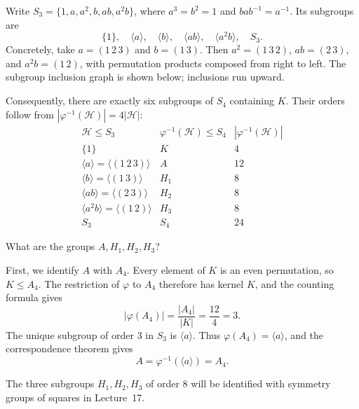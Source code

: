 \documentclass[reqno,11pt]{amsart}
\begin{document}
Write $S_3=\{1,a,a^2,b,ab,a^2b\}$, where $a^3=b^2=1$ and
$bab^{-1}=a^{-1}$. Its subgroups are
\[
  \{1\},\quad \langle a\rangle,\quad
  \langle b\rangle,\quad \langle ab\rangle,\quad
  \langle a^2b\rangle,\quad S_3.
\]
Concretely, take $a=(1\,2\,3)$ and $b=(1\,3)$. Then
$a^2=(1\,3\,2)$, $ab=(2\,3)$, and $a^2b=(1\,2)$, with permutation
products composed from right to left. The subgroup inclusion graph is
shown below; inclusions run upward.
\begin{center}
\end{center}

Consequently, there are exactly six subgroups of $S_4$ containing $K$.
Their orders follow from $|\varphi^{-1}(\mathcal H)|=4|\mathcal H|$:
\[
\begin{array}{c|c|c}
  \mathcal H\leq S_3 & \varphi^{-1}(\mathcal H)\leq S_4
    & |\varphi^{-1}(\mathcal H)|\\ \hline
  \{1\} & K & 4\\
  \langle a\rangle=\langle(1\,2\,3)\rangle & A & 12\\
  \langle b\rangle=\langle(1\,3)\rangle & H_1 & 8\\
  \langle ab\rangle=\langle(2\,3)\rangle & H_2 & 8\\
  \langle a^2b\rangle=\langle(1\,2)\rangle & H_3 & 8\\
  S_3 & S_4 & 24
\end{array}
\]

What are the groups $A,H_1,H_2,H_3$?

First, we identify $A$ with $A_4$. Every element of $K$ is an even
permutation, so $K\leq A_4$. The restriction of $\varphi$ to $A_4$
therefore has kernel $K$, and the counting formula gives
\[
  |\varphi(A_4)|=\frac{|A_4|}{|K|}=\frac{12}{4}=3.
\]
The unique subgroup of order $3$ in $S_3$ is $\langle a\rangle$.
Thus $\varphi(A_4)=\langle a\rangle$, and the correspondence theorem
gives
\[
  A=\varphi^{-1}(\langle a\rangle)=A_4.
\]

The three subgroups $H_1,H_2,H_3$ of order $8$ will be identified
with symmetry groups of squares in Lecture~17.
\end{document}
